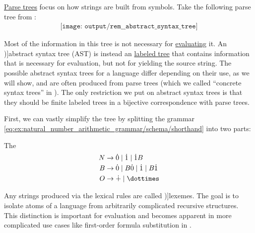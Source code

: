 \begin{concept}\label{con:abstract_syntax_tree}
  \hyperref[def:parse_tree]{Parse trees} focus on how strings are built from symbols. Take the following parse tree from :
  \begin{equation}\label{eq:con:abstract_syntax_tree/base}
    \begin{aligned}
      \texttt{[image: output/rem\_\_abstract\_syntax\_tree]}
    \end{aligned}
  \end{equation}

  Most of the information in this tree is not necessary for \hyperref[con:evaluation]{evaluating} it. An \term[en=abstract syntax tree (\cite[41]{AhoEtAl2006Compilers})]{abstract syntax tree} (AST) is instead an \hyperref[def:labeled_tree]{labeled tree} that contains information that is necessary for evaluation, but not for yielding the source string. The possible abstract syntax trees for a language differ depending on their use, as we will show, and are often produced from parse trees (which we called \enquote{concrete syntax trees} in ). The only restriction we put on abstract syntax trees is that they should be finite labeled trees in a bijective correspondence with parse trees.

  First, we can vastly simplify the tree by splitting the grammar \eqref{eq:ex:natural_number_arithmetic_grammar/schema/shorthand} into two parts:
  \begin{thmenum}
     The 
    \begin{equation*}
      \begin{aligned}
        N &\to \syn0 \mid \syn1 \mid \syn1 B \\
        B &\to \syn0 \mid B \syn0 \mid \syn1 \mid B \syn1 \\
        O &\to \synplus \mid \syntimes
      \end{aligned}
    \end{equation*}

    Any strings produced via the lexical rules are called \term[ru=лексемы (\cite[329]{Гладкий1973Языки})]{lexemes}. The goal is to isolate atoms of a language from arbitrarily complicated recursive structures. This distinction is important for evaluation and becomes apparent in more complicated use cases like first-order formula substitution in .


\end{thmenum}
\end{concept}
